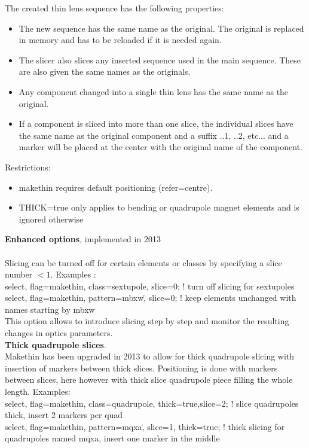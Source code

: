 \documentclass{article}    %
\begin{document}
\noindent
The created thin lens sequence has the following properties:
\begin{itemize}
\item The new sequence has the same name as the original. The original is replaced in memory and has to be reloaded if it is needed again.
\item The slicer also slices any inserted sequence used in the main sequence. These are also given the same names as the originals.
\item Any component changed into a single thin lens has the same name as the original.
\item If a component is sliced into more than one slice, the individual slices have the same name as the original component and a suffix ..1, ..2, etc... and a marker will be placed at the center with the original name of the component.
\end{itemize}


\vspace{0.5cm}
\noindent
Restrictions:
\begin{itemize}
\item makethin requires default positioning (refer=centre).
\item \textsf{\color{darkgreen}THICK=true} only applies to bending or quadrupole magnet elements and is ignored otherwise
\end{itemize}

\vspace{1CM}

\noindent
{\large{\bf Enhanced options}, implemented in 2013}\\ \\
Slicing can be turned off for certain elements or classes by specifying a slice number $< 1$. Examples :\\
\textsf{\color{darkgreen}select, flag=makethin, class=sextupole, slice=0; ! turn off slicing for sextupoles}\\
\textsf{\color{darkgreen}select, flag=makethin, pattern=mbxw\., slice=0;  ! keep elements unchanged with names starting by mbxw}\\
This option allows to introduce slicing step by step and monitor the resulting changes in optics parameters.\\

\noindent
{\bf Thick quadrupole slices}.\\
Makethin has been upgraded in 2013 to allow for thick quadrupole slicing with insertion of markers between thick slices.
Positioning is done with markers between slices, here however with thick slice quadrupole piece filling the whole length.
 Examples:\\
\textsf{\color{darkgreen}select, flag=makethin, class=quadrupole, thick=true,slice=2; ! slice quadrupoles thick, insert 2 markers per quad}\\
\textsf{\color{darkgreen}select, flag=makethin, pattern=mqxa\., slice=1, thick=true; ! thick slicing for quadrupoles named mqxa, insert one marker in the middle}\\
\end{document}
